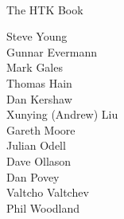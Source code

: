 \documentclass[a4paper,oneside]{book}
\begin{document}
\newlength{\saveindent}


\setlength{\saveindent}{\parindent}





















{ \Large \ \\





\vspace{1cm}





\noindent The HTK Book





\vspace{1cm}





\noindent Steve Young \\


\noindent Gunnar Evermann \\


\noindent Mark Gales \\


\noindent Thomas Hain \\


\noindent Dan Kershaw \\


\noindent Xunying (Andrew) Liu \\


\noindent Gareth Moore \\


\noindent Julian Odell \\


\noindent Dave Ollason \\


\noindent Dan Povey \\


\noindent Valtcho Valtchev \\


\noindent Phil Woodland \\





}
\end{document}
